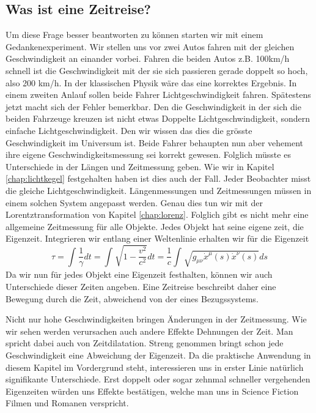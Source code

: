 \begin{refsection}
\section{Was ist eine Zeitreise?}
Um diese Frage besser beantworten zu können starten wir mit einem Gedankenexperiment. Wir stellen uns vor zwei Autos fahren mit der gleichen Geschwindigkeit an einander vorbei. Fahren die beiden Autos z.B. 100km/h schnell ist die Geschwindigkeit mit der sie sich passieren gerade doppelt so hoch, also 200 km/h. In der klassischen Physik wäre das eine korrektes Ergebnis. In einem zweiten Anlauf sollen beide Fahrer Lichtgeschwindigkeit fahren. Spätestens jetzt macht sich der Fehler bemerkbar. Den die Geschwindigkeit in der sich die beiden Fahrzeuge kreuzen ist nicht etwas Doppelte Lichtgeschwindigkeit, sondern einfache Lichtgeschwindigkeit. Den wir wissen das dies die grösste Geschwindigkeit im Universum ist.
Beide Fahrer behaupten nun aber vehement ihre eigene Geschwindigkeitsmessung sei korrekt gewesen. Folglich müsste es Unterschiede in der Längen und Zeitmessung geben.
Wie wir in Kapitel \ref{chap:lichtkegel} festgehalten haben ist dies auch der Fall. Jeder Beobachter misst die gleiche Lichtgeschwindigkeit. Längenmessungen und Zeitmessungen müssen in einem solchen System angepasst werden. Genau dies tun wir mit der Lorentztransformation von Kapitel \ref{chap:lorenz}. Folglich gibt es nicht mehr eine allgemeine Zeitmessung für alle Objekte. Jedes Objekt hat seine eigene zeit, die Eigenzeit.
Integrieren wir entlang einer Weltenlinie erhalten wir für die Eigenzeit
\begin{equation}\label{Eigenzeit}
\tau
=
\int_{}^{}\frac{1}{\gamma}dt=\int_{}^{}\sqrt{1-\frac{v^2}{c^2}}dt
=
\frac{1}{c}\int_{}^{}\sqrt{g_{\mu\nu}\dot{x}^{\mu}(s)\dot{x}^{\nu}(s)}ds
\end{equation}
Da wir nun für jedes Objekt eine Eigenzeit festhalten, können wir auch Unterschiede dieser Zeiten angeben.
Eine Zeitreise beschreibt daher eine Bewegung durch die Zeit, abweichend von der eines Bezugssystems. 

Nicht nur hohe Geschwindigkeiten bringen Änderungen in der Zeitmessung. Wie wir sehen werden verursachen auch andere Effekte Dehnungen der Zeit. Man spricht dabei auch von Zeitdilatation.
Streng genommen bringt schon jede Geschwindigkeit eine Abweichung der Eigenzeit. Da die praktische Anwendung in diesem Kapitel im Vordergrund steht, interessieren uns in erster Linie natürlich signifikante Unterschiede. Erst doppelt oder sogar zehnmal schneller vergehenden Eigenzeiten w\"urden uns Effekte best\"atigen, welche man uns in Science Fiction Filmen und Romanen verspricht.


\end{refsection}
